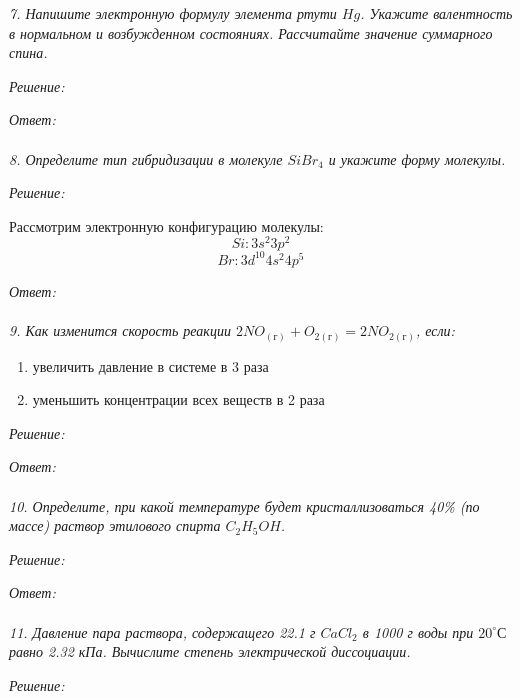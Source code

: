 \emph{7. Напишите электронную формулу элемента ртути \( Hg \). Укажите 
валентность в нормальном и возбужденном состояниях. Рассчитайте значение 
суммарного спина.}

\emph{Решение:}

\emph{Ответ: } \\\\


\emph{8. Определите тип гибридизации в молекуле \( SiBr_4 \) и укажите 
форму молекулы.}

\emph{Решение:}

Рассмотрим электронную конфигурацию молекулы:
\[ Si: 3s^2 3p^2 \]
\[ Br: 3d^10 4s^2 4p^5 \]

\emph{Ответ: } \\\\


\emph{9. Как изменится скорость реакции 
\( 2NO_{(\text{г})} + O_{2(\text{г})} = 2NO_{2(\text{г})} \), если:}
\begin{enumerate}
    \item увеличить давление в системе в 3 раза
    \item уменьшить концентрации всех веществ в 2 раза
\end{enumerate}

\emph{Решение:}

\emph{Ответ: } \\\\


\emph{10. Определите, при какой температуре будет кристаллизоваться 40\% 
(по массе) раствор этилового спирта \( C_2H_5OH \).}

\emph{Решение:}

\emph{Ответ: } \\\\


\emph{11. Давление пара раствора, содержащего 22.1 г \( CaCl_2 \) в 
1000 г воды при \( 20 ^{\circ}С \) равно 2.32 кПа. Вычислите степень 
электрической диссоциации.}

\emph{Решение:}

